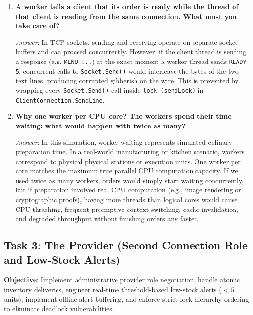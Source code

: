 \documentclass[11pt,a4paper]{article}
\begin{document}
\begin{enumerate}[label=\textbf{Q\arabic*.},leftmargin=*]
    \item \textbf{A worker tells a client that its order is ready while the thread of that client is reading from the same connection. What must you take care of?}
    
    \textit{Answer}: In TCP sockets, sending and receiving operate on separate socket buffers and can proceed concurrently. However, if the client thread is sending a response (e.g. \texttt{MENU ...}) at the exact moment a worker thread sends \texttt{READY 5}, concurrent calls to \texttt{Socket.Send()} would interleave the bytes of the two text lines, producing corrupted gibberish on the wire. This is prevented by wrapping every \texttt{Socket.Send()} call inside \texttt{lock (sendLock)} in \texttt{ClientConnection.SendLine}.

    \item \textbf{Why one worker per CPU core? The workers spend their time waiting: what would happen with twice as many?}
    
    \textit{Answer}: In this simulation, worker waiting represents simulated culinary preparation time. In a real-world manufacturing or kitchen scenario, workers correspond to physical physical stations or execution units. One worker per core matches the maximum true parallel CPU computation capacity. If we used twice as many workers, orders would simply start waiting concurrently, but if preparation involved real CPU computation (e.g., image rendering or cryptographic proofs), having more threads than logical cores would cause CPU thrashing, frequent preemptive context switching, cache invalidation, and degraded throughput without finishing orders any faster.
\end{enumerate}

\subsection{Task 3: The Provider (Second Connection Role and Low-Stock Alerts)}
\textbf{Objective}: Implement administrative provider role negotiation, handle atomic inventory deliveries, engineer real-time threshold-based low-stock alerts ($< 5$ units), implement offline alert buffering, and enforce strict lock-hierarchy ordering to eliminate deadlock vulnerabilities.
\end{document}

